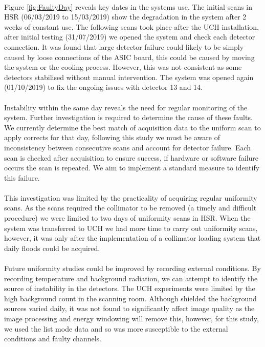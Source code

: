 \paragraph{}
Figure \ref{fig:FaultyDay} reveals key dates in the systems use. The initial scans in \acrshort{HSR} (06/03/2019 to 15/03/2019) show the degradation in the system after 2 weeks of constant use. The following scans took place after the \acrshort{UCH} installation, after initial testing (31/07/2019) we opened the system and check each detector connection. It was found that large detector failure could likely to be simply caused by loose connections of the \acrshort{ASIC} board, this could be caused by moving the system or the cooling process. However, this was not consistent as some detectors stabilised without manual intervention. The system was opened again (01/10/2019) to fix the ongoing issues with detector 13 and 14. 
\paragraph{}
Instability within the same day reveals the need for regular monitoring of the system. Further investigation is required to determine the cause of these faults. We currently determine the best match of acquisition data to the uniform scan to apply corrects for that day, following this study we must be aware of inconsistency between consecutive scans and account for detector failure. Each scan is checked after acquisition to ensure success, if hardware or software failure occurs the scan is repeated. We aim to implement a standard measure to identify this failure. 
\paragraph{}
This investigation was limited by the practicality of acquiring regular uniformity scans. As the scans required the collimator to be removed (a timely and difficult procedure) we were limited to two days of uniformity scans in \acrshort{HSR}. When the system was transferred to \acrshort{UCH} we had more time to carry out uniformity scans, however, it was only after the implementation of a collimator loading system that daily floods could be acquired. 
\paragraph{}
Future uniformity studies could be improved by recording external conditions. By recording temperature and background radiation, we can attempt to identify the source of instability in the detectors. The \acrshort{UCH} experiments were limited by the high background count in the scanning room. Although shielded the background sources varied daily, it was not found to significantly affect image quality as the image processing and energy windowing will remove this, however, for this study, we used the list mode data and so was more susceptible to the external conditions and faulty channels. 
